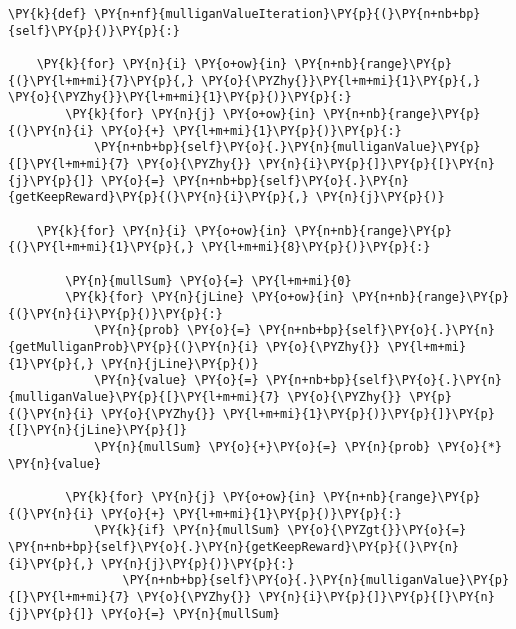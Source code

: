 \begin{Verbatim}[commandchars=\\\{\}]
\PY{k}{def} \PY{n+nf}{mulliganValueIteration}\PY{p}{(}\PY{n+nb+bp}{self}\PY{p}{)}\PY{p}{:}

    \PY{k}{for} \PY{n}{i} \PY{o+ow}{in} \PY{n+nb}{range}\PY{p}{(}\PY{l+m+mi}{7}\PY{p}{,} \PY{o}{\PYZhy{}}\PY{l+m+mi}{1}\PY{p}{,} \PY{o}{\PYZhy{}}\PY{l+m+mi}{1}\PY{p}{)}\PY{p}{:}
        \PY{k}{for} \PY{n}{j} \PY{o+ow}{in} \PY{n+nb}{range}\PY{p}{(}\PY{n}{i} \PY{o}{+} \PY{l+m+mi}{1}\PY{p}{)}\PY{p}{:}
            \PY{n+nb+bp}{self}\PY{o}{.}\PY{n}{mulliganValue}\PY{p}{[}\PY{l+m+mi}{7} \PY{o}{\PYZhy{}} \PY{n}{i}\PY{p}{]}\PY{p}{[}\PY{n}{j}\PY{p}{]} \PY{o}{=} \PY{n+nb+bp}{self}\PY{o}{.}\PY{n}{getKeepReward}\PY{p}{(}\PY{n}{i}\PY{p}{,} \PY{n}{j}\PY{p}{)}

    \PY{k}{for} \PY{n}{i} \PY{o+ow}{in} \PY{n+nb}{range}\PY{p}{(}\PY{l+m+mi}{1}\PY{p}{,} \PY{l+m+mi}{8}\PY{p}{)}\PY{p}{:}
        
        \PY{n}{mullSum} \PY{o}{=} \PY{l+m+mi}{0}
        \PY{k}{for} \PY{n}{jLine} \PY{o+ow}{in} \PY{n+nb}{range}\PY{p}{(}\PY{n}{i}\PY{p}{)}\PY{p}{:}
            \PY{n}{prob} \PY{o}{=} \PY{n+nb+bp}{self}\PY{o}{.}\PY{n}{getMulliganProb}\PY{p}{(}\PY{n}{i} \PY{o}{\PYZhy{}} \PY{l+m+mi}{1}\PY{p}{,} \PY{n}{jLine}\PY{p}{)}
            \PY{n}{value} \PY{o}{=} \PY{n+nb+bp}{self}\PY{o}{.}\PY{n}{mulliganValue}\PY{p}{[}\PY{l+m+mi}{7} \PY{o}{\PYZhy{}} \PY{p}{(}\PY{n}{i} \PY{o}{\PYZhy{}} \PY{l+m+mi}{1}\PY{p}{)}\PY{p}{]}\PY{p}{[}\PY{n}{jLine}\PY{p}{]}
            \PY{n}{mullSum} \PY{o}{+}\PY{o}{=} \PY{n}{prob} \PY{o}{*} \PY{n}{value}

        \PY{k}{for} \PY{n}{j} \PY{o+ow}{in} \PY{n+nb}{range}\PY{p}{(}\PY{n}{i} \PY{o}{+} \PY{l+m+mi}{1}\PY{p}{)}\PY{p}{:}
            \PY{k}{if} \PY{n}{mullSum} \PY{o}{\PYZgt{}}\PY{o}{=} \PY{n+nb+bp}{self}\PY{o}{.}\PY{n}{getKeepReward}\PY{p}{(}\PY{n}{i}\PY{p}{,} \PY{n}{j}\PY{p}{)}\PY{p}{:}
                \PY{n+nb+bp}{self}\PY{o}{.}\PY{n}{mulliganValue}\PY{p}{[}\PY{l+m+mi}{7} \PY{o}{\PYZhy{}} \PY{n}{i}\PY{p}{]}\PY{p}{[}\PY{n}{j}\PY{p}{]} \PY{o}{=} \PY{n}{mullSum}
\end{Verbatim}
